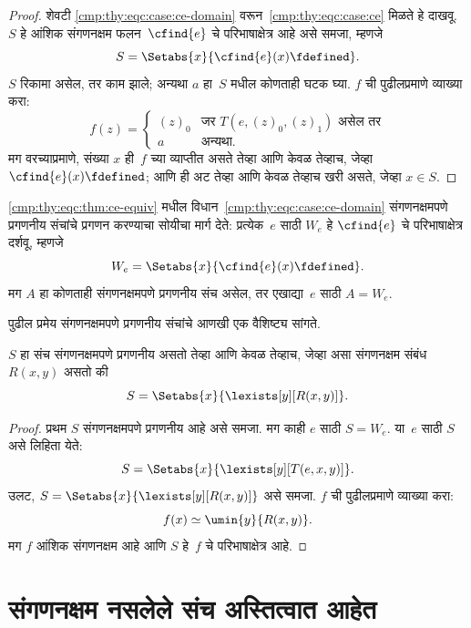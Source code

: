 \begin{proof}
शेवटी \ref{cmp:thy:eqc:case:ce-domain} वरून~\ref{cmp:thy:eqc:case:ce} मिळते
हे दाखवू. $S$ हे आंशिक संगणनक्षम फलन~$\cfind{e}$ चे
परिभाषाक्षेत्र आहे असे समजा, म्हणजे
\[S = \Setabs{x}{\cfind{e}(x) \fdefined}.
\]
$S$ रिकामा असेल, तर काम झाले; अन्यथा $a$ हा~$S$
मधील कोणताही घटक घ्या. $f$ ची पुढीलप्रमाणे व्याख्या करा:
\[f(z) = \begin{cases}
(z)_0 & \text{जर $T(e,(z)_0,(z)_1)$ असेल तर} \\
a & \text{अन्यथा.}
\end{cases}
\]
मग वरच्याप्रमाणे, संख्या $x$ ही~$f$ च्या व्याप्तीत असते तेव्हा आणि
केवळ तेव्हाच, जेव्हा $\cfind{e}(x) \fdefined$; आणि ही अट तेव्हा आणि
केवळ तेव्हाच खरी असते, जेव्हा $x \in S$.

\end{proof}

\ref{cmp:thy:eqc:thm:ce-equiv} मधील विधान~\ref{cmp:thy:eqc:case:ce-domain}
संगणनक्षमपणे प्रगणनीय संचांचे प्रगणन करण्याचा सोयीचा मार्ग देते:
प्रत्येक~$e$ साठी $W_e$ हे $\cfind{e}$ चे परिभाषाक्षेत्र दर्शवू,
म्हणजे
\[W_e = \Setabs{x}{\cfind{e}(x) \fdefined}.
\]
मग $A$ हा कोणताही संगणनक्षमपणे प्रगणनीय संच असेल, तर
एखाद्या~$e$ साठी $A = W_e$.

पुढील प्रमेय संगणनक्षमपणे प्रगणनीय संचांचे आणखी एक वैशिष्ट्य
सांगते.

\begin{thm}
\label{cmp:thy:eqc:thm:exists-char}
$S$ हा संच संगणनक्षमपणे प्रगणनीय असतो तेव्हा आणि केवळ तेव्हाच, जेव्हा
असा संगणनक्षम संबंध $R(x,y)$ असतो की
\[S = \Setabs{ x }{ \lexists[y][R(x,y)] }.
\]
\end{thm}

\begin{proof}
प्रथम $S$ संगणनक्षमपणे प्रगणनीय आहे असे समजा. मग काही
$e$ साठी $S = W_e$. या~$e$ साठी $S$ असे लिहिता येते:
\[S = \Setabs{ x }{ \lexists[y][T(e, x, y)] }.
\]
उलट, $S = \Setabs{ x }{
  \lexists[y][R(x, y)] }$ असे समजा. $f$ ची पुढीलप्रमाणे व्याख्या करा:
\[f(x) \simeq \umin{y}{R(x, y)}.
\]
मग $f$ आंशिक संगणनक्षम आहे आणि $S$ हे~$f$ चे परिभाषाक्षेत्र आहे.
\end{proof}












\section{संगणनक्षम नसलेले संच अस्तित्वात आहेत}\label{cmp:thy:ncp:sec}



